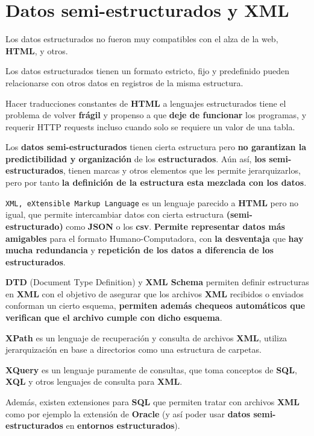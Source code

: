 ﻿\section*{Datos semi-estructurados y XML}

Los datos estructurados no fueron muy compatibles con el alza de la web, \textbf{HTML}, y otros.

Los datos estructurados tienen un formato estricto, fijo y predefinido pueden relacionarse con otros datos en registros de la misma estructura.

Hacer traducciones constantes de \textbf{HTML} a lenguajes estructurados tiene el problema de volver \textbf{frágil} y propenso a que \textbf{deje de funcionar} los programas, y requerir HTTP requests incluso cuando solo se requiere un valor de una tabla.

Los \textbf{datos semi-estructurados} tienen cierta estructura pero \textbf{no garantizan la predictibilidad y organización} de los \textbf{estructurados}. Aún así, \textbf{los semi-estructurados}, tienen marcas y otros elementos que les permite jerarquizarlos, pero por tanto \textbf{la definición de la estructura esta mezclada con los datos}.

\texttt{XML, eXtensible Markup Language} es un lenguaje parecido a \textbf{HTML} pero no igual, que permite intercambiar datos con cierta estructura \textbf{(semi-estructurado)} como \textbf{JSON} o los \textbf{csv}.
\textbf{Permite representar datos más amigables} para el formato Humano-Computadora, con \textbf{la desventaja} que \textbf{hay mucha redundancia} y \textbf{repetición de los datos a diferencia de los estructurados}.

\textbf{DTD} (Document Type Definition) y \textbf{XML Schema} permiten definir estructuras en \textbf{XML} con el objetivo de asegurar que los archivos \textbf{XML} recibidos o enviados conforman un cierto esquema, \textbf{permiten además chequeos automáticos que verifican que el archivo cumple con dicho esquema}.

\textbf{XPath} es un lenguaje de recuperación y consulta de archivos \textbf{XML}, utiliza jerarquización en base a directorios como una estructura de carpetas.

\textbf{XQuery} es un lenguaje puramente de consultas, que toma conceptos de \textbf{SQL}, \textbf{XQL} y otros lenguajes de consulta para \textbf{XML}.

Además, existen extensiones para \textbf{SQL} que permiten tratar con archivos \textbf{XML} como por ejemplo la extensión de \textbf{Oracle} (y así poder usar \textbf{datos semi-estructurados} en \textbf{entornos estructurados}).